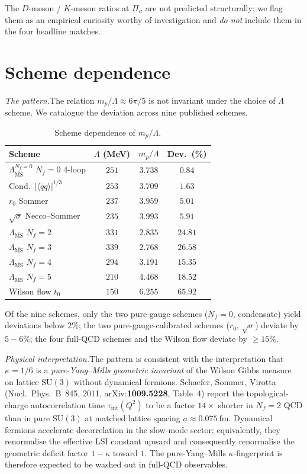 \documentclass[aps,prl,reprint,amsmath,amssymb,nofootinbib,floatfix,superscriptaddress]{revtex4-2}
\newcommand{\SU}{\mathrm{SU}}
\newcommand{\msbar}{\overline{\mathrm{MS}}}
\newcommand{\Piskappa}{\Pi_{\kappa}}
\newcommand{\LambdaMS}{\Lambda_{\msbar}}
\newcommand{\LambdaPG}{\Lambda^{N_f = 0}_{\msbar}}
\begin{document}
The $D$-meson / $K$-meson ratios at $\Piskappa$ are not predicted structurally; we flag them as an empirical curiosity worthy of investigation and \emph{do not} include them in the four headline matches.

\section{Scheme dependence}
\label{sec:scheme}

\textit{The pattern.}\quad The relation $m_p / \Lambda \approx 6\pi/5$ is not invariant under the choice of $\Lambda$ scheme. We catalogue the deviation across nine published schemes.

\begin{table}[t]
\caption{Scheme dependence of $m_p / \Lambda$.}
\label{tab:scheme}
\begin{ruledtabular}
\begin{tabular}{lccc}
Scheme & $\Lambda$ (MeV) & $m_p/\Lambda$ & Dev.~(\%) \\
\hline
$\LambdaPG$ $N_f{=}0$ 4-loop & $251$ & $3.738$ & $\mathbf{0.84}$ \\
Cond.\ $|\langle\bar{q}q\rangle|^{1/3}$ & $253$ & $3.709$ & $\mathbf{1.63}$ \\
$r_0$ Sommer & $237$ & $3.959$ & $5.01$ \\
$\sqrt{\sigma}$ Necco--Sommer & $235$ & $3.993$ & $5.91$ \\
$\LambdaMS$ $N_f{=}2$ & $331$ & $2.835$ & $24.81$ \\
$\LambdaMS$ $N_f{=}3$ & $339$ & $2.768$ & $26.58$ \\
$\LambdaMS$ $N_f{=}4$ & $294$ & $3.191$ & $15.35$ \\
$\LambdaMS$ $N_f{=}5$ & $210$ & $4.468$ & $18.52$ \\
Wilson flow $t_0$ & $150$ & $6.255$ & $65.92$ \\
\end{tabular}
\end{ruledtabular}
\end{table}

Of the nine schemes, only the two pure-gauge schemes ($N_f{=}0$, condensate) yield deviations below $2\%$; the two pure-gauge-calibrated schemes ($r_0$, $\sqrt{\sigma}$) deviate by $5{-}6\%$; the four full-QCD schemes and the Wilson flow deviate by $\ge 15\%$.

\textit{Physical interpretation.}\quad The pattern is consistent with the interpretation that $\kappa = 1/6$ is a \emph{pure-Yang--Mills geometric invariant} of the Wilson Gibbs measure on lattice $\SU(3)$ without dynamical fermions. Schaefer, Sommer, Virotta (Nucl.\ Phys.\ B~845, 2011, arXiv:\textbf{1009.5228}, Table~4) report the topological-charge autocorrelation time $\tau_{\mathrm{int}}(Q^2)$ to be a factor $14\times$ shorter in $N_f{=}2$ QCD than in pure $\SU(3)$ at matched lattice spacing $a \approx 0.075~\mathrm{fm}$. Dynamical fermions accelerate decorrelation in the slow-mode sector; equivalently, they renormalise the effective LSI constant upward and consequently renormalise the geometric deficit factor $1 - \kappa$ toward $1$. The pure-Yang--Mills $\kappa$-fingerprint is therefore expected to be washed out in full-QCD observables.
\end{document}
